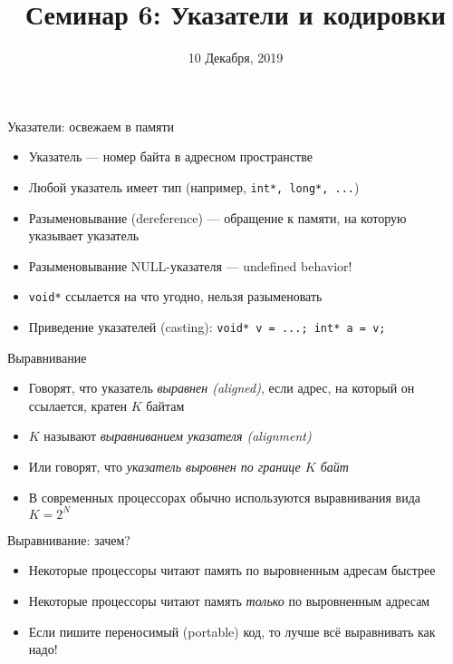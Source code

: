 \documentclass[10pt,pdf,hyperref={unicode}]{beamer}
\title{Семинар 6: Указатели и кодировки}
\date{10 Декабря, 2019}
\begin{document}
\begin{frame}
  \titlepage
\end{frame}

\begin{frame}{Указатели: освежаем в памяти}
    \begin{itemize}
        \item Указатель — номер байта в адресном пространстве
        \item Любой указатель имеет тип (например, \lstinline{int*, long*, ...})
        \item Разыменовывание (dereference) — обращение к памяти, на которую указывает указатель
        \item Разыменовывание NULL-указателя — undefined behavior!
        \item \lstinline{void*} ссылается на что угодно, нельзя разыменовать
        \item Приведение указателей (casting): \lstinline{void* v = ...; int* a = v;}
    \end{itemize}
\end{frame}

\begin{frame}{Выравнивание}
\begin{itemize}
    \item Говорят, что указатель \emph{выравнен (aligned)}, если адрес, на который он ссылается, кратен $K$ байтам
    \item $K$ называют \emph{выравниванием указателя (alignment)}
    \item Или говорят, что \emph{указатель выровнен по границе $K$ байт}
    \item В современных процессорах обычно используются выравнивания вида $K = 2^N$
\end{itemize}
\end{frame}

\begin{frame}{Выравнивание: зачем?}
\begin{itemize}
    \item Некоторые процессоры читают память по выровненным адресам быстрее
    \item Некоторые процессоры читают память \emph{только} по выровненным адресам
    \item Если пишите переносимый (portable) код, то лучше всё выравнивать как надо!
\end{itemize}
\end{frame}
\end{document}
